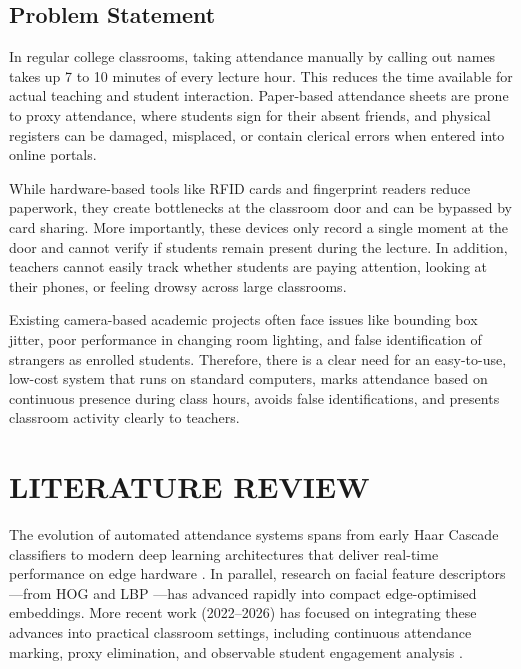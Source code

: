 \documentclass[10pt]{report}
\begin{document}
\section{Problem Statement}
\hspace{0.5cm}In regular college classrooms, taking attendance manually by calling out names takes up 7 to 10 minutes of every lecture hour. This reduces the time available for actual teaching and student interaction. Paper-based attendance sheets are prone to proxy attendance, where students sign for their absent friends, and physical registers can be damaged, misplaced, or contain clerical errors when entered into online portals.

\hspace{0.5cm}While hardware-based tools like RFID cards and fingerprint readers reduce paperwork, they create bottlenecks at the classroom door and can be bypassed by card sharing. More importantly, these devices only record a single moment at the door and cannot verify if students remain present during the lecture. In addition, teachers cannot easily track whether students are paying attention, looking at their phones, or feeling drowsy across large classrooms.

\hspace{0.5cm}Existing camera-based academic projects often face issues like bounding box jitter, poor performance in changing room lighting, and false identification of strangers as enrolled students. Therefore, there is a clear need for an easy-to-use, low-cost system that runs on standard computers, marks attendance based on continuous presence during class hours, avoids false identifications, and presents classroom activity clearly to teachers.

\chapter{LITERATURE REVIEW}
\linespread{1.5}

\hspace{0.5cm}The evolution of automated attendance systems spans from early Haar Cascade classifiers \cite{viola2004robust} to modern deep learning architectures that deliver real-time performance on edge hardware \cite{zhang2023realtime, george2024edgeface}. In parallel, research on facial feature descriptors—from HOG \cite{dalal2005histograms} and LBP \cite{ahonen2006face}—has advanced rapidly into compact edge-optimised embeddings. More recent work (2022--2026) has focused on integrating these advances into practical classroom settings, including continuous attendance marking, proxy elimination, and observable student engagement analysis \cite{rajesh2023smart, booth2023engagement, ghodekar2023activeness}.
\end{document}
